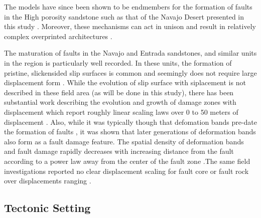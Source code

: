 \documentclass[12pt,a4paper]{article}
\begin{document}
The models have since been shown to be endmembers for the formation of faults in the High porosity sandstone such as that of the Navajo Desert presented in this study . Moreover, these mechanisms can act in unison and result in relatively complex overprinted architectures \cite{davatzes2003overprinting}.

The maturation of faults in the Navajo and Entrada sandstones, and similar units in the region is particularly well recorded. In these units, the formation of pristine, slickensided slip surfaces is common and seemingly does not require large displacement form \cite{aydin1977faulting, aydin1978development}. While the evolution of slip surface with siplacement is not  described in these field area (as will be done in this study), there has been substantial work describing the evolution and growth of damage zones with displacement which report roughly linear scaling laws over 0 to 50 meters of displacement \cite{shipton2001damage, shipton2003conceptual, davatzes2005distribution}. Also, while it was typically though that defomation bands pre-date the formation of faults \cite{aydin1977faulting, aydin1978development}, it was shown that later generations of deformation bands also form as a fault damage feature. The spatial density of deformation bands and fault damage rapidly decreases with increasing distance from the fault according to a power law away from the center of the fault zone  \cite{shipton2001damage, shipton2003conceptual}.The same field investigations reported no clear displacement scaling for fault core or fault rock over displacements ranging \cite{shipton2001damage, shipton2006thick}.

\subsection{Tectonic Setting}
\end{document}
